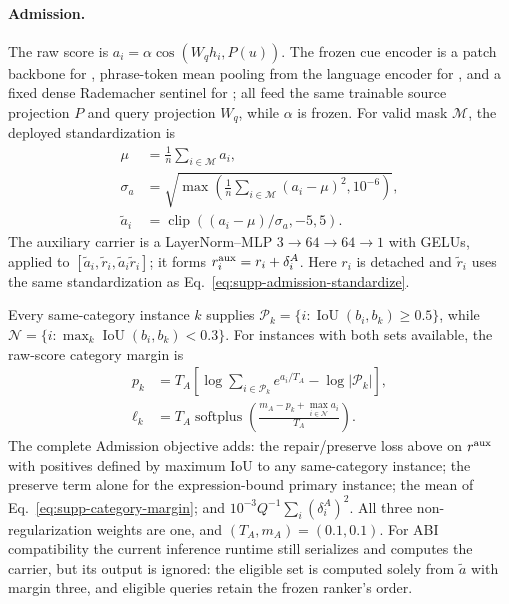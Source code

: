 \paragraph{Admission.}
The raw score is
$a_i=\alpha\cos(W_qh_i,P(u))$.  The frozen cue encoder is a patch backbone for
\arrowv, phrase-token mean pooling from the language encoder for \arrowt, and
a fixed dense Rademacher sentinel for \arrown; all feed the same trainable
source projection $P$ and query projection $W_q$, while $\alpha$ is frozen.
For valid mask $\mathcal M$, the deployed standardization is
\begin{equation}
 \begin{aligned}
 \mu&=\frac{1}{n}\sum_{i\in\mathcal M}a_i,\\
 \sigma_a&=\sqrt{\max\!\left(
 \frac{1}{n}\sum_{i\in\mathcal M}(a_i-\mu)^2,10^{-6}\right)},\\
 \tilde a_i&=\operatorname{clip}((a_i-\mu)/\sigma_a,-5,5).
 \end{aligned}
 \label{eq:supp-admission-standardize}
\end{equation}
The auxiliary carrier is a LayerNorm--MLP $3\!\to\!64\!\to\!64\!\to\!1$
with GELUs, applied to
$[\tilde a_i,\tilde r_i,\tilde a_i\tilde r_i]$; it forms
$r_i^{\rm aux}=r_i+\delta_i^A$.  Here $r_i$ is detached and $\tilde r_i$ uses
the same standardization as Eq.~\eqref{eq:supp-admission-standardize}.

Every same-category instance $k$ supplies
$\mathcal P_k=\{i:\operatorname{IoU}(b_i,b_k)\geq0.5\}$, while
$\mathcal N=\{i:\max_k\operatorname{IoU}(b_i,b_k)<0.3\}$.  For instances
with both sets available, the raw-score category margin is
\begin{equation}
 \begin{aligned}
 p_k&=T_A\!\left[\log\!\sum_{i\in\mathcal P_k}e^{a_i/T_A}
       -\log|\mathcal P_k|\right],\\
 \ell_k&=T_A\operatorname{softplus}
       \left(\frac{m_A-p_k+\max_{i\in\mathcal N}a_i}{T_A}\right).
 \end{aligned}
 \label{eq:supp-category-margin}
\end{equation}
The complete Admission objective adds: the repair/preserve loss above on
$r^{\rm aux}$ with positives defined by maximum IoU to any same-category
instance; the preserve term alone for the expression-bound primary instance;
the mean of Eq.~\eqref{eq:supp-category-margin}; and
$10^{-3}Q^{-1}\sum_i(\delta_i^A)^2$.  All three non-regularization weights are
one, and $(T_A,m_A)=(0.1,0.1)$.  For ABI compatibility the current inference
runtime still serializes and computes the carrier, but its output is ignored:
the eligible set is computed solely from $\tilde a$ with margin three, and
eligible queries retain the frozen ranker's order.

